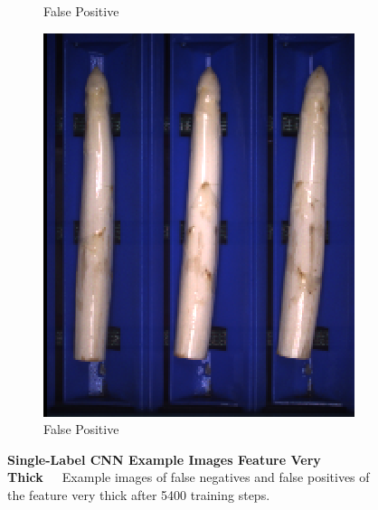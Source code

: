 \begin{figure}[h]
\begin{subfigure}{0.3\textwidth}
		\vspace{-5pt}
		\caption{False Positive}
	\end{subfigure}
	\begin{subfigure}{0.3\textwidth}
		\includegraphics[width=0.9\linewidth]{Figures/appendix/verythick_falsepositive_03.png}
		\vspace{-5pt}
		\caption{False Positive}
	\end{subfigure}
    \caption[Single-Label CNN Example Images Feature Very Thick]{\textbf{Single-Label CNN Example Images Feature Very Thick}~~~Example images of false negatives and false positives of the feature very thick after 5400 training steps.}
    	\vspace{-20pt}
    \label{fig:ExampleImagesVeryThick}
\end{figure}

